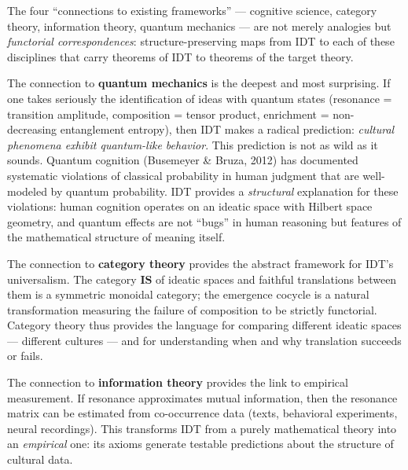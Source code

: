 \begin{interpretation}
\label{interp:ch22:cognitive_category_quantum}
The four ``connections to existing frameworks'' --- cognitive science,
category theory, information theory, quantum mechanics --- are not merely
analogies but \emph{functorial correspondences}: structure-preserving maps
from IDT to each of these disciplines that carry theorems of IDT to
theorems of the target theory.

The connection to \textbf{quantum mechanics} is the deepest and most
surprising.  If one takes seriously the identification of ideas with
quantum states (resonance = transition amplitude, composition = tensor
product, enrichment = non-decreasing entanglement entropy), then IDT
makes a radical prediction: \emph{cultural phenomena exhibit quantum-like
behavior}.  This prediction is not as wild as it sounds.  Quantum
cognition (Busemeyer \& Bruza, 2012) has documented systematic violations
of classical probability in human judgment that are well-modeled by
quantum probability.  IDT provides a \emph{structural} explanation for
these violations: human cognition operates on an ideatic space with
Hilbert space geometry, and quantum effects are not ``bugs'' in human
reasoning but features of the mathematical structure of meaning itself.

The connection to \textbf{category theory} provides the abstract framework
for IDT's universalism.  The category $\mathbf{IS}$ of ideatic spaces
and faithful translations between them is a symmetric monoidal category;
the emergence cocycle is a natural transformation measuring the failure
of composition to be strictly functorial.  Category theory thus provides
the language for comparing different ideatic spaces --- different
cultures --- and for understanding when and why translation succeeds or
fails.

The connection to \textbf{information theory} provides the link to
empirical measurement.  If resonance approximates mutual information,
then the resonance matrix can be estimated from co-occurrence data
(texts, behavioral experiments, neural recordings).  This transforms IDT
from a purely mathematical theory into an \emph{empirical} one: its
axioms generate testable predictions about the structure of cultural data.
\end{interpretation}

